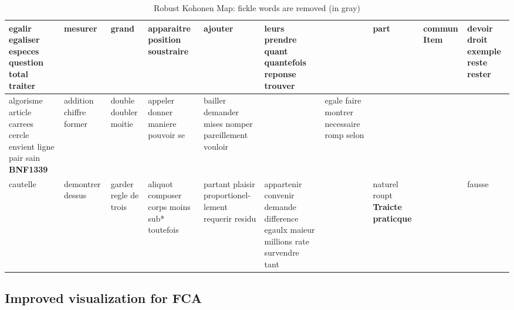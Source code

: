 \documentclass[runningheads,a4paper]{llncs}
\begin{document}
\begin{table}[h!]
{\begin{tabular}{|p{1.9cm}|p{1.9cm}|p{1.9cm}|p{1.9cm}|p{1.9cm}|p{1.9cm}|p{1.9cm}|p{1.9cm}|p{1.9cm}|p{1.9cm}|}
\hline
egalir egaliser especes question total traiter & mesurer & grand & apparaitre  \textcolor{gris}{position}  \textcolor{gris}{soustraire} &  \textcolor{gris}{ajouter} & leurs prendre quant quantefois reponse trouver & &  \textcolor{gris}{part} & commun Item & devoir  \textcolor{gris}{droit}  \textcolor{gris}{exemple} reste rester\\
\hline
algorisme article carrees cercle envient ligne pair sain \cellcolor{grisclair} \textbf{BNF1339} & addition chiffre former &  \textcolor{gris}{double}  \textcolor{gris}{doubler} moitie & appeler  \textcolor{gris}{donner}  \textcolor{gris}{maniere}  \textcolor{gris}{pouvoir}  \textcolor{gris}{se}& bailler demander mises nomper pareillement vouloir & & egale faire montrer necessaire romp selon & & & \\
\hline
cautelle & demontrer dessus &  \textcolor{gris}{garder}  \textcolor{gris}{regle}  \textcolor{gris}{de}  \textcolor{gris}{trois} & aliquot composer corps moins sub* toutefois & partant plaisir proportionel- lement requerir residu & appartenir convenir demande difference egaulx maieur millions rate survendre tant & & naturel roupt \cellcolor{grisclair} \textbf{Traicte praticque} & & fausse\\
\hline
\end{tabular}
}
\caption{Robust Kohonen Map: fickle words are removed (in gray)}
\end{table}



\subsection{Improved visualization for FCA}
\end{document}
